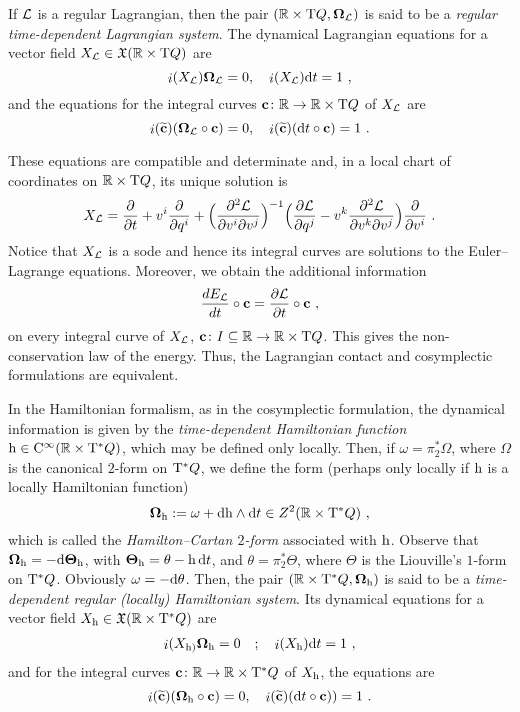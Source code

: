 \documentclass[12pt]{report}
\def\beq{\begin{equation}}
\def\eeq{\end{equation}}
\def\beann{\begin{eqnarray*}}
\def\eeann{\end{eqnarray*}}
\def\derpar#1#2{\frac{\partial{#1}}{\partial{#2}}}
\def\vf{\mathfrak X}
\def\Lag{{\cal L}}
\def\d{{\rm d}}
\def\Real{\mathbb{R}}
\def\Tan{{\rm T}}
\def\inn{\mathop{i}\nolimits}
\def\Cinfty{{\rm C}^\infty}
\begin{document}
If $\Lag$ is a regular Lagrangian, then the pair  $(\Real\times\Tan Q,\mbox{\boldmath $\Omega$}_\Lag)$
is said to be a {\sl regular time-dependent Lagrangian system}.
The dynamical Lagrangian equations for a vector field 
$X_{\cal L}\in\vf(\Real\times\Tan Q)$ are
\beq
\inn(X_{\cal L})\mbox{\boldmath $\Omega$}_\Lag = 0
,\quad
\inn(X_{\cal L})\d t = 1 \ ,
\label{contacteq}
\eeq
and the equations for the integral curves ${\bf c}\colon\Real\to\Real\times\Tan Q$ of $X_{\cal L}$ are
$$
\inn(\widetilde{\bf c})(\mbox{\boldmath $\Omega$}_\Lag\circ{\bf c}) = 0
,\quad
\inn(\widetilde{\bf c})(\d t\circ{\bf c}) = 1 \ .
$$

These equations are compatible and determinate and,
in a local chart of coordinates on $\Real\times\Tan Q$, its unique solution is
$$
X_{\cal L} =\derpar{}{t}+ v^i \derpar{}{q^i} + 
\Bigl(\displaystyle\frac{\partial^2{\cal L}}{\partial{v^i}\partial{v^j}}\Bigr)^{-1}
\Big(\derpar{{\cal L}}{q^j} -
v^k\frac{\partial^2{\cal L}}{\partial v^k \partial v^j}\Big)\derpar{}{v^i} \ .
$$
Notice that $X_{\cal L}$ is a {\sc sode} and hence
its integral curves are solutions to the Euler--Lagrange equations.
Moreover, we obtain the additional information
$$
\frac{dE_{\cal L}}{dt}\circ{\bf c} = \derpar{{\cal L}}{t}\circ{\bf c} \ ,
$$
on every integral curve of $X_\Lag$, ${\bf c}\colon I\subseteq\Real\to\Real\times\Tan Q$.
This gives the non-conservation law of the energy.
Thus, the Lagrangian contact and cosymplectic formulations are equivalent. 

In the Hamiltonian formalism, as in the cosymplectic formulation,
the dynamical information is given by the 
{\sl time-dependent Hamiltonian function}
${\rm h} \in\Cinfty(\Real\times\Tan^*Q)$,
which may be defined only locally.
Then, if $\omega=\pi_2^*\Omega$, where $\Omega$ is the canonical $2$-form on $\Tan^*Q$,
we define the form (perhaps only locally if ${\rm h}$
is a locally Hamiltonian function)
$$
\mbox{\boldmath $\Omega$}_ {\rm h }:= \omega + \d{\rm h} \wedge\d t \in Z^2(\Real\times\Tan^*Q) \ ,
$$
which is called the {\sl Hamilton--Cartan $2$-form} associated with ${\rm h}$.
Observe that  
$\mbox{\boldmath $\Omega$}_{\rm h}=-\d\mbox{\boldmath $\Theta$}_{\rm h}$, with
$\mbox{\boldmath $\Theta$}_{\rm h}=\theta-{\rm h}\,\d t$,
and $\theta=\pi_2^*\Theta$, where $\Theta$ is the Liouville's $1$-form on $\Tan^*Q$. Obviously $\omega=-\d\theta$.
Then, the pair $(\Real\times\Tan^*Q,\mbox{\boldmath $\Omega$}_{\rm h})$ is said to be a {\sl time-dependent regular (locally) Hamiltonian system}.
Its dynamical equations for a vector field 
$X_{\rm h}\in\vf(\Real\times\Tan^*Q)$ are
\beann
\inn(X_{\rm h)}\mbox{\boldmath $\Omega$}_{\rm h} = 0
\quad ; \quad
\inn(X_{\rm h})\d t = 1 \ ,
\eeann
and for the integral curves ${\bf c}\colon\Real\to\Real\times\Tan^*Q$ of $X_{\rm h}$, the equations are
$$
\inn(\widetilde{\bf c})(\mbox{\boldmath $\Omega$}_{\rm h}\circ{\bf c}) = 0
,\quad
\inn(\widetilde{\bf c})(\d t\circ{\bf c})) = 1 \ .
$$
\end{document}
